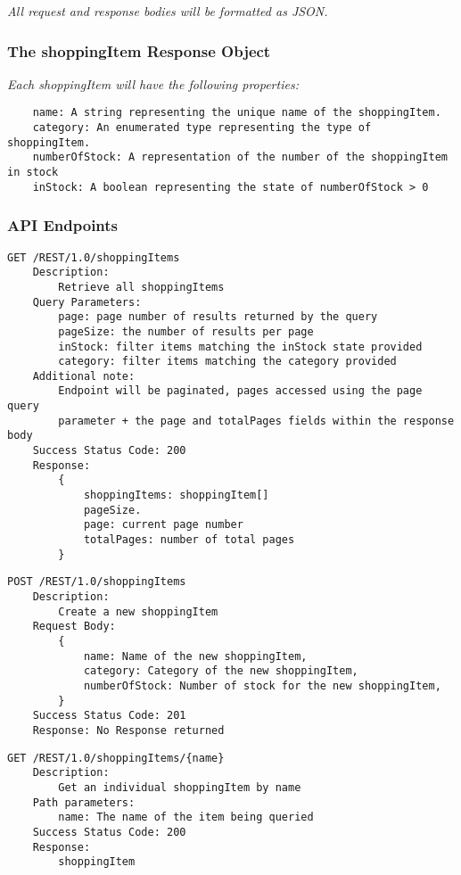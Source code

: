 \emph{All request and response bodies will be formatted as JSON.}

\subsubsection{The shoppingItem Response Object}
\emph{Each shoppingItem will have the following properties:}
\begin{verbatim}
    name: A string representing the unique name of the shoppingItem.
    category: An enumerated type representing the type of shoppingItem.
    numberOfStock: A representation of the number of the shoppingItem in stock
    inStock: A boolean representing the state of numberOfStock > 0
\end{verbatim}
\subsubsection{API Endpoints}
\begin{verbatim}
GET /REST/1.0/shoppingItems
    Description:
        Retrieve all shoppingItems
    Query Parameters:
        page: page number of results returned by the query
        pageSize: the number of results per page
        inStock: filter items matching the inStock state provided
        category: filter items matching the category provided
    Additional note:
        Endpoint will be paginated, pages accessed using the page query 
        parameter + the page and totalPages fields within the response body
    Success Status Code: 200
    Response: 
        {
            shoppingItems: shoppingItem[]
            pageSize.
            page: current page number
            totalPages: number of total pages
        }
\end{verbatim}\medskip

\begin{verbatim}
POST /REST/1.0/shoppingItems
    Description:
        Create a new shoppingItem
    Request Body:
        {
            name: Name of the new shoppingItem,
            category: Category of the new shoppingItem,
            numberOfStock: Number of stock for the new shoppingItem,
        }
    Success Status Code: 201
    Response: No Response returned
\end{verbatim}\medskip

\begin{verbatim}
GET /REST/1.0/shoppingItems/{name}
    Description:
        Get an individual shoppingItem by name
    Path parameters:
        name: The name of the item being queried
    Success Status Code: 200
    Response:
        shoppingItem
\end{verbatim}\medskip

